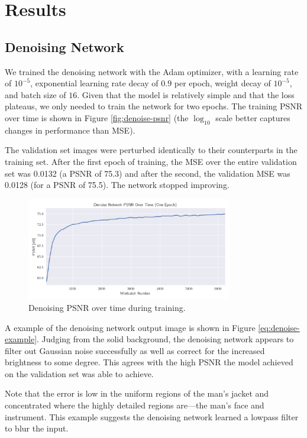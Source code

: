 \documentclass[justified]{article}
\begin{document}
  \section{Results}

  \subsection{Denoising Network}

  We trained the denoising network with the Adam optimizer, with a learning rate of $10^{-5}$, exponential learning rate decay of $0.9$ per epoch, weight decay of $10^{-5}$, and batch size of $16$.
  Given that the model is relatively simple and that the loss plateaus, we only needed to train the network for two epochs.
  The training PSNR over time is shown in Figure \eqref{fig:denoise-psnr} (the $\log_{10}$ scale better captures changes in performance than MSE).

  The validation set images were perturbed identically to their counterparts in the training set.
  After the first epoch of training, the MSE over the entire validation set was 0.0132 (a PSNR of 75.3) and after the second, the validation MSE was 0.0128 (for a PSNR of 75.5).
  The network stopped improving.

  \begin{figure}[H]
    \centering
    \includegraphics[width=0.8\textwidth]{figures/denoise-psnr}
    \caption{Denoising PSNR over time during training.}
    \label{fig:denoise-psnr}
  \end{figure}

  A example of the denoising network output image is shown in Figure \ref{eq:denoise-example}.
  Judging from the solid background, the denoising network appears to filter out Gaussian noise successfully as well as correct for the increased brightness to some degree.
  This agrees with the high PSNR the model achieved on the validation set was able to achieve.

  Note that the error is low in the uniform regions of the man's jacket and concentrated where the highly detailed regions are---the man's face and instrument.
  This example suggests the denoising network learned a lowpass filter to blur the input.
\end{document}
